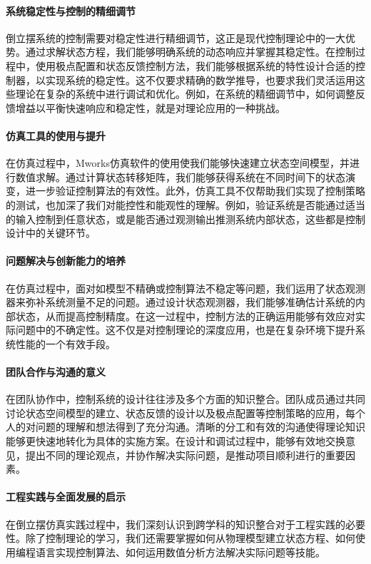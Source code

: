 \documentclass{ctexart}
\begin{document}
		\paragraph{系统稳定性与控制的精细调节}\qquad
		倒立摆系统的控制需要对稳定性进行精细调节，这正是现代控制理论中的一大优势。通过求解状态方程，我们能够明确系统的动态响应并掌握其稳定性。在控制过程中，使用极点配置和状态反馈控制方法，我们能够根据系统的特性设计合适的控制器，以实现系统的稳定性。这不仅要求精确的数学推导，也要求我们灵活运用这些理论在复杂的系统中进行调试和优化。例如，在系统的精细调节中，如何调整反馈增益以平衡快速响应和稳定性，就是对理论应用的一种挑战。
		\paragraph{仿真工具的使用与提升}\qquad
		在仿真过程中，Mworks仿真软件的使用使我们能够快速建立状态空间模型，并进行数值求解。通过计算状态转移矩阵，我们能够获得系统在不同时间下的状态演变，进一步验证控制算法的有效性。此外，仿真工具不仅帮助我们实现了控制策略的测试，也加深了我们对能控性和能观性的理解。例如，验证系统是否能通过适当的输入控制到任意状态，或是能否通过观测输出推测系统内部状态，这些都是控制设计中的关键环节。
		\paragraph{问题解决与创新能力的培养}\qquad
		在仿真过程中，面对如模型不精确或控制算法不稳定等问题，我们运用了状态观测器来弥补系统测量不足的问题。通过设计状态观测器，我们能够准确估计系统的内部状态，从而提高控制精度。在这一过程中，控制方法的正确运用能够有效应对实际问题中的不确定性。这不仅是对控制理论的深度应用，也是在复杂环境下提升系统性能的一个有效手段。
		\paragraph{团队合作与沟通的意义}\qquad
		在团队协作中，控制系统的设计往往涉及多个方面的知识整合。团队成员通过共同讨论状态空间模型的建立、状态反馈的设计以及极点配置等控制策略的应用，每个人的对问题的理解和想法得到了充分沟通。清晰的分工和有效的沟通使得理论知识能够更快速地转化为具体的实施方案。在设计和调试过程中，能够有效地交换意见，提出不同的理论观点，并协作解决实际问题，是推动项目顺利进行的重要因素。
		\paragraph{工程实践与全面发展的启示}\qquad
		在倒立摆仿真实践过程中，我们深刻认识到跨学科的知识整合对于工程实践的必要性。除了控制理论的学习，我们还需要掌握如何从物理模型建立状态方程、如何使用编程语言实现控制算法、如何运用数值分析方法解决实际问题等技能。
		
\end{document}
